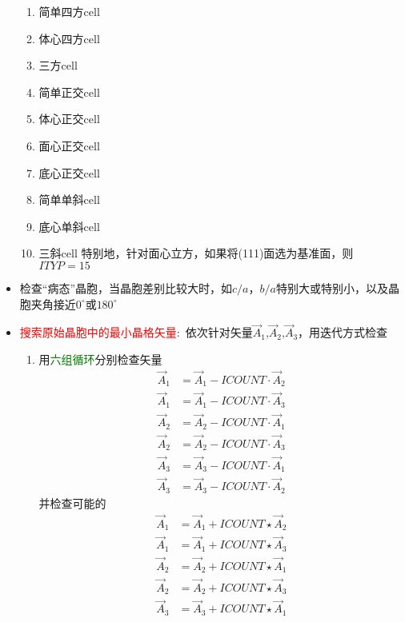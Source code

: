 \documentclass{article}      %
\begin{document}
\begin{itemize}
\begin{enumerate}
			\item 简单四方\textrm{cell}
			\item 体心四方\textrm{cell}
			\item 三方\textrm{cell}
			\item 简单正交\textrm{cell}
			\item 体心正交\textrm{cell}
			\item 面心正交\textrm{cell}
			\item 底心正交\textrm{cell}
			\item 简单单斜\textrm{cell}
			\item 底心单斜\textrm{cell}
			\item 三斜\textrm{cell}
		特别地，针对面心立方，如果将(111)面选为基准面，则$\mathit{ITYP}=15$
		\end{enumerate}
	\item 检查“病态”晶胞，当晶胞差别比较大时，如$c/a$，$b/a$特别大或特别小，以及晶胞夹角接近$0^{\circ}$或$180^{\circ}$
	\item \textcolor{red}{搜索原始晶胞中的最小晶格矢量}:~依次针对矢量$\vec A_1$,$\vec A_2$,$\vec A_3$，用迭代方式检查
		\begin{enumerate}
			\item 用\textcolor{green}{六组循环}分别检查矢量
				\begin{displaymath}
					\begin{aligned}
						\vec A_1&=\vec A_1-\mathit{ICOUNT}\cdot\vec A_2\\
						\vec A_1&=\vec A_1-\mathit{ICOUNT}\cdot\vec A_3\\
						\vec A_2&=\vec A_2-\mathit{ICOUNT}\cdot\vec A_1\\
						\vec A_2&=\vec A_2-\mathit{ICOUNT}\cdot\vec A_3\\
						\vec A_3&=\vec A_3-\mathit{ICOUNT}\cdot\vec A_1\\
						\vec A_3&=\vec A_3-\mathit{ICOUNT}\cdot\vec A_2
					\end{aligned}
				\end{displaymath}
				并检查可能的
				\begin{displaymath}
					\begin{aligned}
						\vec A_1&=\vec A_1+\mathit{ICOUNT}\star\vec A_2\\
						\vec A_1&=\vec A_1+\mathit{ICOUNT}\star\vec A_3\\
						\vec A_2&=\vec A_2+\mathit{ICOUNT}\star\vec A_1\\
						\vec A_2&=\vec A_2+\mathit{ICOUNT}\star\vec A_3\\
						\vec A_3&=\vec A_3+\mathit{ICOUNT}\star\vec A_1\\

\end{aligned}
\end{displaymath}
\end{enumerate}
\end{itemize}
\end{document}
